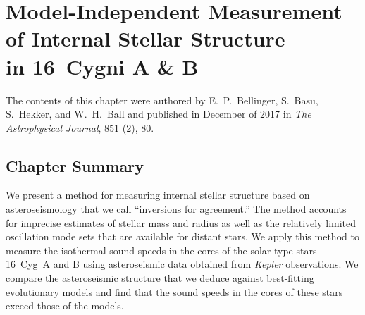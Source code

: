 \chapter{Model-Independent Measurement of Internal Stellar Structure \\in 16~Cygni A \& B}
\label{chap:inversion}

\vspace{2cm}
The contents of this chapter were authored by E.~P.~Bellinger, S.~Basu, S.~Hekker, and W.~H.~Ball and published in December of 2017 in \emph{The Astrophysical Journal}, 851 (2), 80. 
\nocite{2017ApJ...851...80B}

\vspace*{1cm}

\section*{Chapter Summary}
We present a method for measuring internal stellar structure based on asteroseismology that we call ``inversions for agreement.'' 
The method accounts for imprecise estimates of stellar mass and radius as well as the relatively limited oscillation mode sets that are available for distant stars. 
We apply this method to measure the isothermal sound speeds in the cores of the solar-type stars 16~Cyg~A and B using asteroseismic data obtained from \emph{Kepler} observations. 
We compare the asteroseismic structure that we deduce against best-fitting evolutionary models and find that the sound speeds in the cores of these stars exceed those of the models. 
\newpage

